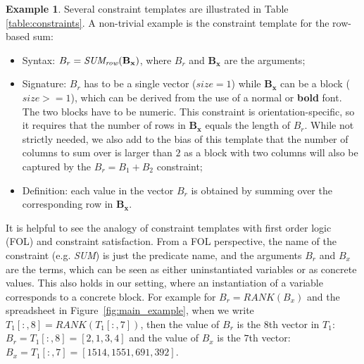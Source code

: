 \documentclass{IEEEtran}
\newcommand{\CName}{Syntax\xspace}
\newcommand{\CSignature}{Signature\xspace}
\newcommand{\CFunction}{Definition\xspace}
\newcommand{\range}[3]{\ensuremath{#1[#2,#3]}}
\newcommand{\rangeall}{:}
\newcommand{\eccalc}[2]{\ensuremath{#1 = #2}}
\newcommand{\ecrank}[2]{\eccalc{#1}{\textit{RANK}(#2)}}
\newcommand{\ecsumr}[2]{\eccalc{#1}{\textit{SUM\textsubscript{row}}(#2)}}
\newcommand{\sg}{B}
\theoremstyle{definition}
\newtheorem{example}{Example}
\begin{document}
\begin{example}
Several constraint templates are illustrated in Table \ref{table:constraints}. A non-trivial example is the constraint template for the row-based sum:

\begin{itemize}
  \item \CName: $\ecsumr{\sg_r}{\mathbf{\sg_x}}$, where $\sg_r$ and $\mathbf{\sg_x}$ are the arguments;
  
  \item \CSignature: $\sg_r$ has to be a single vector ($\textit{size}=1$) while $\mathbf{\sg_x}$ can be a block ($\textit{size}>=1$), which can be derived from the use of a normal or \textbf{bold} font. The two blocks have to be numeric. This constraint is orientation-specific, so it requires that the number of rows in $\mathbf{\sg_x}$ equals the length of $\sg_r$. While not strictly needed, we also add to the bias of this template that the number of columns to sum over is larger than $2$ as a block with two columns will also be captured by the $\eccalc{\sg_r}{\sg_1 + \sg_2}$ constraint;
  
  \item \CFunction: each value in the vector $\sg_{r}$ is obtained by summing over the corresponding row in $\mathbf{\sg_x}$.
\end{itemize}
\end{example}


It is helpful to see the analogy of constraint templates with first order logic (FOL) and constraint satisfaction.
From a FOL perspective, the name of the constraint (e.g. \textit{SUM}) is just the predicate name, and the arguments $B_r$ and $B_x$ are the terms, which can be seen as either uninstantiated variables or as concrete values.
This also holds in our setting, where an instantiation of a variable corresponds to a concrete block. For example for $\ecrank{B_r}{B_x}$ and the spreadsheet in Figure~\ref{fig:main_example}, when we write $\ecrank{\range{T_1}{\rangeall}{8}}{\range{T_1}{\rangeall}{7}}$, then the value of $B_r$ is the $8$th vector in $T_1$: $B_r = \range{T_1}{\rangeall}{8} = [2,1,3,4]$ and the value of $B_x$ is the $7$th vector: $B_x = \range{T_1}{\rangeall}{7} = [1514, 1551, 691, 392]$.

\end{document}
